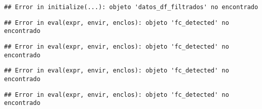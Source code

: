 \documentclass[
]{book}
\newenvironment{Shaded}{\begin{snugshade}}{\end{snugshade}}
\newcommand{\FunctionTok}[1]{\textcolor[rgb]{0.00,0.00,0.00}{#1}}
\newcommand{\NormalTok}[1]{#1}
\newcommand{\SpecialCharTok}[1]{\textcolor[rgb]{0.00,0.00,0.00}{#1}}
\begin{document}
\begin{verbatim}
## Error in initialize(...): objeto 'datos_df_filtrados' no encontrado
\end{verbatim}

\begin{Shaded}
\end{Shaded}

\begin{verbatim}
## Error in eval(expr, envir, enclos): objeto 'fc_detected' no encontrado
\end{verbatim}

\begin{Shaded}
\end{Shaded}

\begin{verbatim}
## Error in eval(expr, envir, enclos): objeto 'fc_detected' no encontrado
\end{verbatim}

\begin{Shaded}
\end{Shaded}

\begin{verbatim}
## Error in eval(expr, envir, enclos): objeto 'fc_detected' no encontrado
\end{verbatim}

\begin{Shaded}
\end{Shaded}

\begin{verbatim}
## Error in eval(expr, envir, enclos): objeto 'fc_detected' no encontrado
\end{verbatim}

\begin{Shaded}
\end{Shaded}
\end{document}
